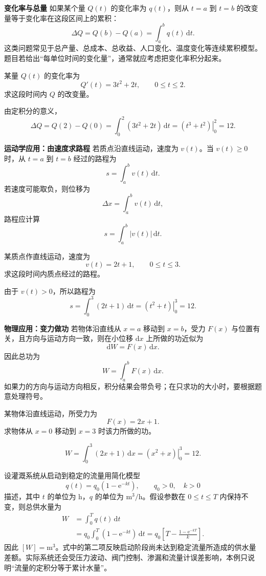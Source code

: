 \documentclass[fontset=fandol]{ctexart}
\newenvironment{custom}[1]{\par\noindent\textbf{#1}\quad}{\par\vspace{0.8em}}
\newcommand{\dd}{\mathrm{d}}
\newcommand{\ee}{\mathrm{e}}
\begin{document}
\begin{custom}{变化率与总量}
如果某个量 $Q(t)$ 的变化率为 $q(t)$，则从 $t=a$ 到 $t=b$ 的改变量等于变化率在这段区间上的累积：
\[
\Delta Q=Q(b)-Q(a)=\int_a^b q(t)\,\dd t.
\]
这类问题常见于总产量、总成本、总收益、人口变化、温度变化等连续累积模型。题目若给出“每单位时间的变化量”，通常就应考虑把变化率积分起来。
\end{custom}

\begin{example}[由变化率求总量]
某量 $Q(t)$ 的变化率为
\[
Q'(t)=3t^2+2t,\qquad 0\leq t\leq2.
\]
求这段时间内 $Q$ 的改变量。

由定积分的意义，
\[
\Delta Q=Q(2)-Q(0)=\int_0^2(3t^2+2t)\,\dd t
=\left.(t^3+t^2)\right|_0^2=12.
\]
\end{example}

\begin{custom}{运动学应用：由速度求路程}
若质点沿直线运动，速度为 $v(t)$。当 $v(t)\geq0$ 时，从 $t=a$ 到 $t=b$ 经过的路程为
\[
s=\int_a^b v(t)\,\dd t.
\]
若速度可能取负，则位移为
\[
\Delta x=\int_a^b v(t)\,\dd t,
\]
路程应计算
\[
s=\int_a^b |v(t)|\,\dd t.
\]
\end{custom}

\begin{example}[由速度求路程]
某质点作直线运动，速度为
\[
v(t)=2t+1,\qquad 0\leq t\leq3.
\]
求这段时间内质点经过的路程。

由于 $v(t)>0$，所以路程为
\[
s=\int_0^3(2t+1)\,\dd t
=\left.(t^2+t)\right|_0^3=12.
\]
\end{example}

\begin{custom}{物理应用：变力做功}
若物体沿直线从 $x=a$ 移动到 $x=b$，受力 $F(x)$ 与位置有关，且方向与运动方向一致，则在小位移 $\dd x$ 上所做的功近似为
\[
\dd W=F(x)\,\dd x.
\]
因此总功为
\[
W=\int_a^bF(x)\,\dd x.
\]
如果力的方向与运动方向相反，积分结果会带负号；在只求功的大小时，要根据题意处理符号。
\end{custom}

\begin{example}[变力做功]
某物体沿直线运动，所受力为
\[
F(x)=2x+1.
\]
求物体从 $x=0$ 移动到 $x=3$ 时该力所做的功。

\[
W=\int_0^3(2x+1)\,\dd x=\left.(x^2+x)\right|_0^3=12.
\]
\end{example}

\begin{application}[农业：总灌溉水量]
设灌溉系统从启动到稳定的流量用简化模型
\[
q(t)=q_0(1-\ee^{-kt}),\qquad q_0>0,\quad k>0
\]
描述，其中 $t$ 的单位为 $\mathrm h$，$q$ 的单位为 $\mathrm{m^3/h}$。假设参数在 $0\leq t\leq T$ 内保持不变，则总供水量为
\[
\begin{aligned}
W&=\int_0^Tq(t)\,\dd t\\
&=q_0\int_0^T(1-\ee^{-kt})\,\dd t
=q_0\left[T-\frac{1-\ee^{-kT}}{k}\right].
\end{aligned}
\]
因此 $[W]=\mathrm{m^3}$。式中的第二项反映启动阶段尚未达到稳定流量所造成的供水量差额。实际系统还会受压力波动、阀门控制、渗漏和流量计误差影响，本例只说明“流量的定积分等于累计水量”。
\end{application}
\end{document}

